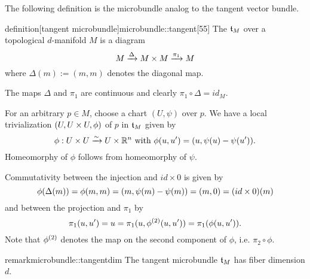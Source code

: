 \begin{myparagraph}
    The following definition is the microbundle analog
    to the tangent vector bundle.
\end{myparagraph}

\begin{mystatement}{definition}[tangent microbundle]{microbundle::tangent}[55]
    The  $\mathfrak{t}_M$ over a topological $d$-manifold $M$ is a diagram
    \[ M \xrightarrow{\Delta} M \times M \xrightarrow{\pi_1} M{} \]
    where $\Delta(m) := (m, m)$ denotes the diagonal map.
\end{mystatement}

\begin{myproof}
    The maps $\Delta$ and $\pi_1$ are continuous and clearly $\pi_1 \circ \Delta = id_M$.

    For an arbitrary $p \in M$,
    choose a chart $(U, \psi)$ over $p$.
    We have a local trivialization $(U, U \times U, \phi)$ of $p$ in $\mathfrak{t}_M$ given by
    \[ \phi: U \times U \xrightarrow{\sim} U \times \mathbb{R}^n \text{ with } \phi(u, u') = (u, \psi(u) - \psi(u')). \]
    Homeomorphy of $\phi$ follows from homeomorphy of $\psi$.
    
    Commutativity between the injection and $id \times 0$ is given by
    \[ \phi(\Delta(m)) = \phi(m, m) = (m, \psi(m) - \psi(m)) = (m, 0) = (id \times 0)(m)\]
    and between the projection and $\pi_1$ by
    \[ \pi_1(u, u') = u = \pi_1(u, \phi^{(2)}(u, u')) = \pi_1(\phi(u, u')). \]
    Note that $\phi^{(2)}$ denotes the map on
    the second component of $\phi$, i.e. $\pi_2 \circ \phi$.
\end{myproof}

\begin{mystatement}{remark}{microbundle::tangentdim}
    The tangent microbundle $\mathfrak{t}_M$ has fiber dimension $d$.
\end{mystatement}
